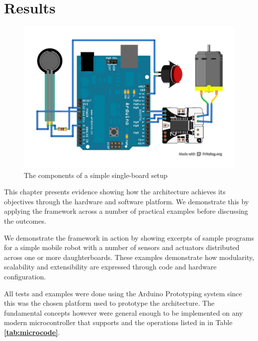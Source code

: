 \chapter{Results} 
\label{chap:results}

\begin{figure}
  \begin{center}
    \includegraphics[width=1.0\columnwidth]{Figures/simple-example.pdf}
    \caption{The components of a simple single-board \xten setup} \label{fig:singleboard}
  \end{center}
\end{figure}

This chapter presents evidence showing how the \xten architecture achieves its objectives through the hardware and software platform. We demonstrate this by applying the framework across a number of practical examples before discussing the outcomes.

 We demonstrate the framework in action by showing excerpts of sample programs for a simple mobile robot with a number of sensors and actuators distributed across one or more daughterboards. These examples demonstrate how modularity, scalability and extensibility are expressed through code and hardware configuration.
 
All tests and examples were done using the Arduino Prototyping system since this was the chosen platform used to prototype the \xten architecture. The fundamental concepts however were general enough to be implemented on any modern microcontroller that supports \iic and the operations listed in in Table \textbf{\ref{tab:microcode}}.

